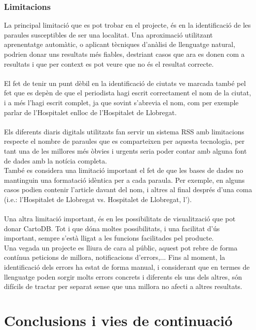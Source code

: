 \documentclass[12pt,a4paper,openright,oneside]{article}
\numberwithin{equation}{section}
\theoremstyle{definition}
\begin{document}
\subsubsection*{Limitacions}
La principal limitació que es pot trobar en el projecte, és en la identificació de les paraules susceptibles de ser una localitat. Una aproximació utilitzant aprenentatge automàtic, o aplicant tècniques d'anàlisi de llenguatge natural, podrien donar uns resultats més fiables, destriant casos que ara es donen com a resultats i que per context es pot veure que no és el resultat correcte.\\\\
El fet de tenir un punt dèbil en la identificació de ciutats ve marcada també pel fet que es depèn de que el periodista hagi escrit correctament el nom de la ciutat, i a més l'hagi escrit complet, ja que sovint s'abrevia el nom, com per exemple parlar de l'Hospitalet enlloc de l'Hospitalet de Llobregat.\\\\
Els diferents diaris digitals utilitzats fan servir un sistema RSS amb limitacions respecte el nombre de paraules que es comparteixen per aquesta tecnologia, per tant una de les millores més òbvies i urgents seria poder contar amb alguna font de dades amb la notícia completa.\\
També es considera una limitació important el fet de que les bases de dades no mantinguin una formatació idèntica per a cada paraula. Per exemple, en alguns casos podien contenir l'article davant del nom, i altres al final després d'una coma (i.e.: l'Hospitalet de Llobregat vs. Hospitalet de Llobregat, l').\\\\
Una altra limitació important, és en les possibilitats de visualització que pot donar CartoDB. Tot i que dóna moltes possibilitats, i una facilitat d'ús important, sempre s'està lligat a les funcions facilitades pel producte.\\
Una vegada un projecte es lliura de cara al públic, aquest pot rebre de forma contínua peticions de millora, notificacions d'errors,... Fins al moment, la identificació dels errors ha estat de forma manual, i considerant que en termes de llenguatge poden sorgir molts errors concrets i diferents els uns dels altres, són difícils de tractar per separat sense que una millora no afecti a altres resultats.

\newpage

\section{Conclusions i vies de continuació}
\end{document}
